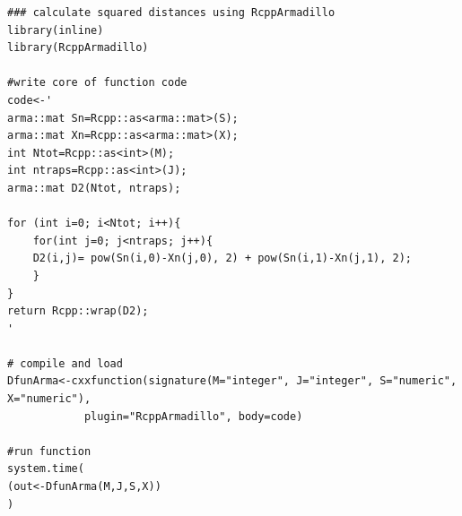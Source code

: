 {\small
\begin{verbatim}
### calculate squared distances using RcppArmadillo
library(inline)
library(RcppArmadillo)

#write core of function code
code<-'
arma::mat Sn=Rcpp::as<arma::mat>(S);
arma::mat Xn=Rcpp::as<arma::mat>(X);
int Ntot=Rcpp::as<int>(M);
int ntraps=Rcpp::as<int>(J);
arma::mat D2(Ntot, ntraps);

for (int i=0; i<Ntot; i++){
	for(int j=0; j<ntraps; j++){
	D2(i,j)= pow(Sn(i,0)-Xn(j,0), 2) + pow(Sn(i,1)-Xn(j,1), 2);
	}
}
return Rcpp::wrap(D2);
'

# compile and load 
DfunArma<-cxxfunction(signature(M="integer", J="integer", S="numeric", X="numeric"), 
			plugin="RcppArmadillo", body=code)

#run function
system.time(
(out<-DfunArma(M,J,S,X))
)
\end{verbatim}
}







